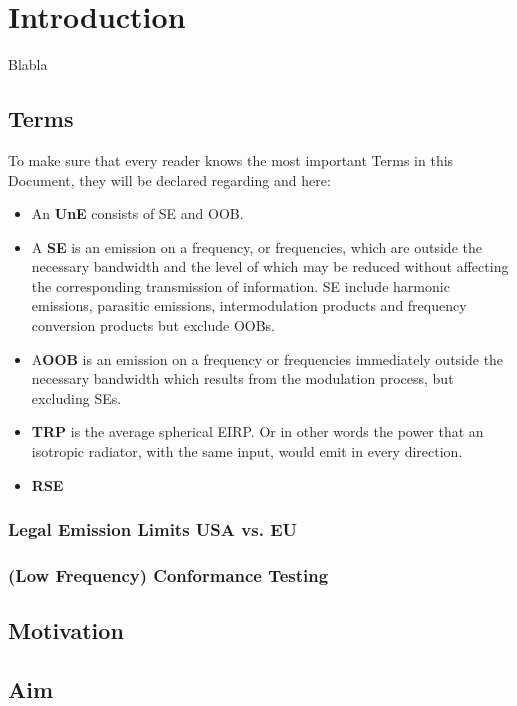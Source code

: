 \chapter{Introduction}

Blabla \cite{2018arXiv180310993F} \cite{keysightota} \cite{inproceedings} \cite{6375745} \cite{SWB-1658557611} \cite{19510} \cite{1446714} \\

\section{Terms}

To make sure that every reader knows the most important Terms in this Document, they will be declared regarding \cite{seitur} and \cite{ctiaat} here:

\begin{itemize}
\item An \textbf{\acf{UnE}} consists of \acl{SE} and \acl{OOB}.
\item A \textbf{\acf{SE}} is an emission on a frequency, or frequencies, which are outside the necessary bandwidth and the level of which may be reduced without affecting the corresponding transmission of information. \acl{SE} include harmonic
emissions, parasitic emissions, intermodulation products and frequency conversion products but exclude \aclp{OOB}.
\item A\textbf{\acf{OOB}} is an emission on a frequency or frequencies immediately outside the necessary bandwidth which results from the modulation process, but excluding \aclp{SE}.
\item \textbf{\acf{TRP}} is the average spherical \ac{EIRP}. Or in other words the power that an isotropic radiator, with the same input, would emit in every direction.
\item \textbf{\acf{RSE}}
\end{itemize}

\subsection{Legal Emission Limits USA vs. EU}

\subsection{(Low Frequency) Conformance Testing}

\section{Motivation}

\section{Aim}